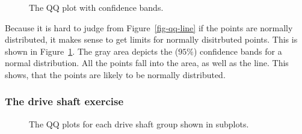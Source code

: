 \documentclass[
  a4paper,
]{scrbook}
\begin{document}
\begin{figure}[H]


\caption{\label{fig-qq-bands}The QQ plot with confidence bands.}

\end{figure}%

Because it is hard to judge from Figure~\ref{fig-qq-line} if the points
are normally distributed, it makes sense to get limits for normally
disitrbuted points. This is shown in Figure~\ref{fig-qq-bands}. The gray
area depicts the (\(95\%\)) confidence bands for a normal distribution.
All the points fall into the area, as well as the line. This shows, that
the points are likely to be normally distributed.

\subsubsection{The drive shaft
exercise}\label{the-drive-shaft-exercise-1}

\begin{figure}[H]


\caption{\label{fig-qq-ds}The QQ plots for each drive shaft group shown
in subplots.}

\end{figure}%
\end{document}
